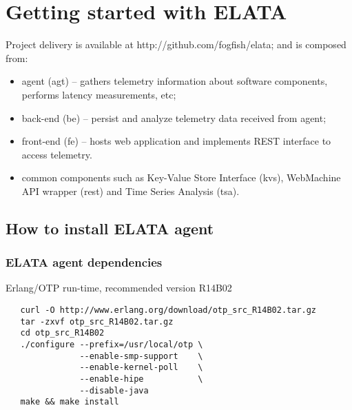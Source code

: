 \section{Getting started with ELATA}

Project delivery is available at http://github.com/fogfish/elata; and is composed from:
\begin{itemize}
\item agent (agt) -- gathers telemetry information about software components, performs latency measurements, etc;
\item back-end (be) -- persist and analyze telemetry data received from agent;
\item front-end (fe) -- hosts web application and implements REST interface to access telemetry.
\item common components such as Key-Value Store Interface (kvs), WebMachine API wrapper (rest) and Time Series Analysis (tsa).   
\end{itemize}


\subsection{How to install ELATA agent}

\subsubsection{ELATA agent dependencies}

Erlang/OTP run-time, recommended version R14B02
\begin{verbatim}
   curl -O http://www.erlang.org/download/otp_src_R14B02.tar.gz
   tar -zxvf otp_src_R14B02.tar.gz
   cd otp_src_R14B02
   ./configure --prefix=/usr/local/otp \
               --enable-smp-support    \
               --enable-kernel-poll    \
               --enable-hipe           \
               --disable-java
   make && make install            
\end{verbatim}

